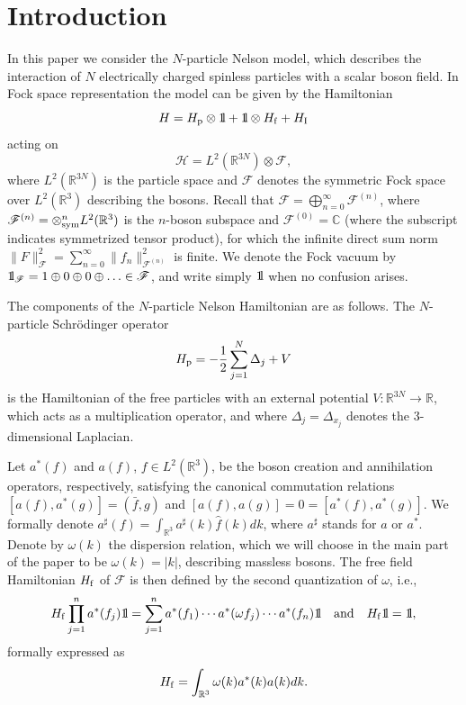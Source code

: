 \documentclass[11pt]{article}
\def\bbbone{{\mathchoice {\rm 1\mskip-4mu l} {\rm 1\mskip-4mu l}
{\rm 1\mskip-4.5mu l} {\rm 1\mskip-5mu l}}}
\def\one{\bbbone}
\providecommand{\BR}{{\mathbb{R}^3 }}
\providecommand{\BRN}{{\mathbb{R}^{3N} }}
\providecommand{\RR}{\mathbb{R}}
\providecommand{\LR}{{L^2(\BR)}}
\providecommand{\LRN}{{L^2(\BRN)}}
\providecommand{\hn}{H}%
\providecommand{\ms}[1]{\mathscr{#1}}
\providecommand{\fff}{\mathscr{F}}
\providecommand{\add}{a^\ast}
\providecommand{\ass}{a^\sharp}
\providecommand{\hf}{H_{\rm f}}
\providecommand{\hi}{H_{\rm I}}
\providecommand{\hp}{H_{\rm p}}
\providecommand{\hhh}{\ms H} %
\providecommand{\1}{\mathbb{1}}
\providecommand {\R} {\ensuremath{\mathbb{R}}}
\providecommand {\F}  {\ms F}
\begin{document}
\newpage
\section{Introduction}
In this paper we consider the $N$-particle Nelson model, which describes the interaction
of $N$ electrically charged spinless particles with a scalar boson field.
In Fock space representation the model can be given by the Hamiltonian
\begin{equation} \label{Ham}
\hn = \hp\otimes \one +\one \otimes \hf  + \hi
\end{equation}
acting on
$$
\hhh=\LRN \otimes\F,
$$
where $L^{2}(\R^{3N})$ is the particle space and $\F$ denotes the symmetric Fock space over $\LR$
describing the bosons. Recall that $\F = \bigoplus_{n=0}^{\infty} \F^{(n)}$, where $\F^{(n)} =
{{\otimes}^n_{\rm sym}}\LR$ is the $n$-boson subspace and $\F^{(0)} = \mathbb{C}$ (where the
subscript indicates symmetrized tensor product), for which the infinite direct sum norm
$\|F\|_{\fff}^2 = \sum_{n=0}^{\infty}\|f_n\|_{\F^{(n)}}^2$ is finite. We denote the Fock vacuum
by $\one_\fff=1\oplus 0\oplus 0\oplus\ldots \in\fff$, and write simply $\one$ when no confusion
arises.

The components of the $N$-particle Nelson Hamiltonian are as follows. The $N$-particle Schr\"odinger
operator
$$
\hp = -\frac{1}{2} \sum_{j=1}^N  \Delta_j + V
$$
is the Hamiltonian of the free particles with  an external potential $V: \RR^{3N}  \to \R$, which
acts as a multiplication operator, and where $\Delta_j=\Delta_{x_j}$ denotes the 3-dimensional
Laplacian.

Let $\add (f)$ and $a(f)$, $f\in\LR$, be the boson creation and annihilation operators, respectively,
satisfying the  canonical commutation relations $[a(f),\add(g)]=(\bar f, g)$ and $[a(f),a(g)]=0=
[\add(f), \add(g)]$. We formally denote $\ass(f)=\int _\BR \ass(k) \widehat f(k) dk$, where $\ass$
stands for $a$ or $\add$. Denote by $\omega(k)$ the dispersion relation, which we will choose in
the main part of the paper to be $\omega(k) = |k|$, describing massless bosons. The free field
Hamiltonian $\hf$ of $\fff$ is then defined by the second quantization of $\omega$,
i.e.,
$$
\hf \prod_{j=1}^n \add(f_j)\one= \sum_{j=1}^n \add(f_1)\cdots\add(\omega f_j)\cdots\add(f_n)\one
\quad \mbox{and} \quad \hf \one=\one,
$$
formally expressed as
$$
\hf = \int_\BR \omega(k) \add(k)a(k)  dk.
$$
\end{document}
